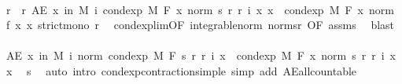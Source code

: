 \begin{isabellebody}
\ \ \isamarkupfalse%
\ r{\isacharprime}{\kern0pt}\ \ r{\isacharprime}{\kern0pt}{\isacharcolon}{\kern0pt}\ {\isachardoublequoteopen}AE\ x\ in\ M{\isachardot}{\kern0pt}\ {\isacharparenleft}{\kern0pt}{\isasymlambda}i{\isachardot}{\kern0pt}\ {\isacharparenleft}{\kern0pt}cond{\isacharunderscore}{\kern0pt}exp\ M\ F\ {\isacharparenleft}{\kern0pt}{\isasymlambda}x{\isachardot}{\kern0pt}\ norm\ {\isacharparenleft}{\kern0pt}s\ {\isacharparenleft}{\kern0pt}r\ {\isacharparenleft}{\kern0pt}r{\isacharprime}{\kern0pt}\ i{\isacharparenright}{\kern0pt}{\isacharparenright}{\kern0pt}\ x{\isacharparenright}{\kern0pt}{\isacharparenright}{\kern0pt}\ x{\isacharparenright}{\kern0pt}{\isacharparenright}{\kern0pt}\ {\isasymlonglonglongrightarrow}\ cond{\isacharunderscore}{\kern0pt}exp\ M\ F\ {\isacharparenleft}{\kern0pt}{\isasymlambda}x{\isachardot}{\kern0pt}\ norm\ {\isacharparenleft}{\kern0pt}f\ x{\isacharparenright}{\kern0pt}{\isacharparenright}{\kern0pt}\ x{\isachardoublequoteclose}\ {\isachardoublequoteopen}strict{\isacharunderscore}{\kern0pt}mono\ r{\isacharprime}{\kern0pt}{\isachardoublequoteclose}\ \isamarkupfalse%
\ cond{\isacharunderscore}{\kern0pt}exp{\isacharunderscore}{\kern0pt}lim{\isacharbrackleft}{\kern0pt}OF\ integrable{\isacharunderscore}{\kern0pt}norm\ norm{\isacharunderscore}{\kern0pt}s{\isacharunderscore}{\kern0pt}r{\isacharcomma}{\kern0pt}\ OF\ assms{\isacharbrackright}{\kern0pt}\ \isamarkupfalse%
\ blast\isanewline
\isanewline
\ \ \isamarkupfalse%
\ {\isachardoublequoteopen}AE\ x\ in\ M{\isachardot}{\kern0pt}\ {\isasymforall}i{\isachardot}{\kern0pt}\ norm\ {\isacharparenleft}{\kern0pt}cond{\isacharunderscore}{\kern0pt}exp\ M\ F\ {\isacharparenleft}{\kern0pt}s\ {\isacharparenleft}{\kern0pt}r\ {\isacharparenleft}{\kern0pt}r{\isacharprime}{\kern0pt}\ i{\isacharparenright}{\kern0pt}{\isacharparenright}{\kern0pt}{\isacharparenright}{\kern0pt}\ x{\isacharparenright}{\kern0pt}\ {\isasymle}\ cond{\isacharunderscore}{\kern0pt}exp\ M\ F\ {\isacharparenleft}{\kern0pt}{\isasymlambda}x{\isachardot}{\kern0pt}\ norm\ {\isacharparenleft}{\kern0pt}s\ {\isacharparenleft}{\kern0pt}r\ {\isacharparenleft}{\kern0pt}r{\isacharprime}{\kern0pt}\ i{\isacharparenright}{\kern0pt}{\isacharparenright}{\kern0pt}\ x{\isacharparenright}{\kern0pt}{\isacharparenright}{\kern0pt}\ x{\isachardoublequoteclose}\ \isamarkupfalse%
\ s\ \isamarkupfalse%
\ {\isacharparenleft}{\kern0pt}auto\ intro{\isacharcolon}{\kern0pt}\ cond{\isacharunderscore}{\kern0pt}exp{\isacharunderscore}{\kern0pt}contraction{\isacharunderscore}{\kern0pt}simple\ simp\ add{\isacharcolon}{\kern0pt}\ AE{\isacharunderscore}{\kern0pt}all{\isacharunderscore}{\kern0pt}countable{\isacharparenright}{\kern0pt}\isanewline

\end{isabellebody}
